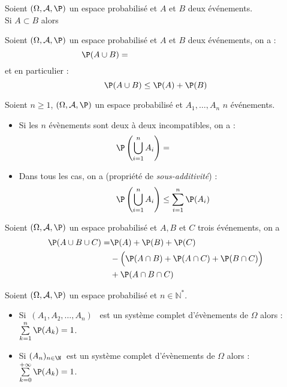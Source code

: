 \documentclass[a4paper,10pt]{report}
\begin{document}
\begin{prop}[croissance]
Soient $(\Omega, \mathcal{A}, \P)$ un espace probabilisé et $A$ et $B$ deux événements.\\
Si $A \subset B$ alors $\phantom{\P(A) \leq \P(B)}$
\end{prop}

\begin{thm}
Soient $(\Omega, \mathcal{A}, \P)$ un espace probabilisé et $A$ et $B$ deux événements, on a :
$$\P(A \cup B)=\phantom{\P(A)+\P(B)-P(A \cap B)}$$
et en particulier :
$$ \P(A \cup B) \leq \P(A) + \P(B)$$
\end{thm}

\begin{thm}
Soient $n \geq 1$, $(\Omega, \mathcal{A}, \P)$ un espace probabilisé et $A_1, \ldots, A_n$ $n$ événements.
\begin{itemize}
\item Si les $n$ évènements sont deux à deux incompatibles, on a :
$$\P \left( \bigcup_{i=1}^n A_i\right)= \phantom{\sum_{i=1}^n \P(A_i)}$$
\item Dans tous les cas, on a (propriété de \textit{sous-additivité}) :
$$ \P \left(\bigcup_{i=1}^n A_i \right) \leq \sum_{i=1}^n \P(A_i) $$
\end{itemize}
\end{thm}

\begin{thm}
Soient $(\Omega, \mathcal{A}, \P)$ un espace probabilisé et $A, B$ et $C$ trois événements, on a
 \begin{align*}
  \P(A\cup B \cup C) = & \P(A) + \P(B) + \P(C) \\
  &- \Big( \P(A\cap B) + \P(A\cap C) + \P(B\cap C) \Big) \\
  &+ \P(A\cap B \cap C)
 \end{align*}
\end{thm}


\begin{prop}
Soient $(\Omega, \mathcal{A}, \P)$ un espace probabilisé et $n \in \mathbb{N}^*$.
\begin{itemize}
\item Si $\,(A_1, A_2,\ldots, A_n)$ \ est un système complet d'évènements de $\Omega$ alors :
$\sum\limits_{k=1}^{n } \P(A_k) = 1$. 
\item Si $(A_n)_{n\in \N}\,$ est un système complet d'évènements de $\Omega$ alors :
$\sum\limits_{k=0}^{+\infty } \P(A_k) = 1$. 
\end{itemize}
\end{prop}
\end{document}

